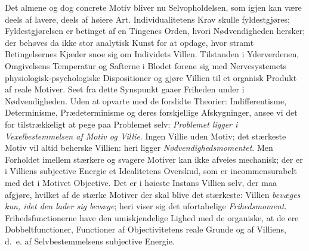 \documentclass[12pt]{article}
\newcommand{\opage}[1]{\marginnote{\footnotesize\textit{[#1]}}}
\begin{document}
Det almene og dog concrete Motiv bliver nu Selvopholdelsen, som
igjen kan være deels af lavere, deels af høiere Art.
Individualitetens Krav skulle fyldestgjøres; Fyldestgjørelsen er
betinget af en Tingenes Orden, hvori Nødvendigheden hersker; der
behøves da ikke stor analytisk Kunst for at opdage, hvor
\opage{63} stramt Betingelsernes Kjæder snoe sig om Individets Villen.
Tilstanden i Yderverdenen, Omgivelsens Temperatur og Safterne i
Blodet forene sig med Nervesystemets physiologisk-psychologiske
Dispositioner og gjøre Villien til et organisk Produkt af reale
Motiver. Seet fra dette Synspunkt gaaer Friheden under i
Nødvendigheden. Uden at opvarte med de forslidte Theorier:
Indifferentisme, Determinisme, Prædeterminisme og deres forskjellige
Afskygninger, ansee vi det for tilstrækkeligt at pege paa Problemet
selv: \emph{Problemet ligger i Vexelbestemmelsen af Motiv og Villie}.
Ingen Villie uden Motiv; det stærkeste Motiv vil altid beherske
Villien: heri ligger \emph{Nødvendighedsmomentet}. Men Forholdet
imellem stærkere og svagere Motiver kan ikke afveies mechanisk; der
er i Villiens subjective Energie et Idealitetens Overskud, som er
incommensurabelt med det i Motivet Objective. Det er i høieste
Instans Villien selv, der maa afgjøre, hvilket af de stærke Motiver
der skal blive det stærkeste: Villien \emph{bevæges kun, idet den
lader sig bevæge}; heri viser sig det ufortabelige
\emph{Frihedsmoment}. Frihedsfunctionerne have den umiskjendelige
Lighed med de organiske, at de ere Dobbeltfunctioner, Functioner af
Objectivitetens reale Grunde og af Villiens, d.\ e. af
Selvbestemmelsens subjective Energie.
\end{document}
